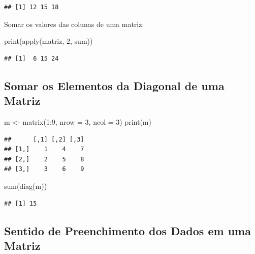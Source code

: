 \documentclass[
]{article}
\newenvironment{Shaded}{\begin{snugshade}}{\end{snugshade}}
\newcommand{\AttributeTok}[1]{\textcolor[rgb]{0.77,0.63,0.00}{#1}}
\newcommand{\DecValTok}[1]{\textcolor[rgb]{0.00,0.00,0.81}{#1}}
\newcommand{\FunctionTok}[1]{\textcolor[rgb]{0.00,0.00,0.00}{#1}}
\newcommand{\NormalTok}[1]{#1}
\newcommand{\OtherTok}[1]{\textcolor[rgb]{0.56,0.35,0.01}{#1}}
\newcommand{\SpecialCharTok}[1]{\textcolor[rgb]{0.00,0.00,0.00}{#1}}
\begin{document}
\begin{verbatim}
## [1] 12 15 18
\end{verbatim}

Somar os valores das colunas de uma matriz:

\begin{Shaded}
\begin{Highlighting}[]
\FunctionTok{print}\NormalTok{(}\FunctionTok{apply}\NormalTok{(matriz, }\DecValTok{2}\NormalTok{, sum))}
\end{Highlighting}
\end{Shaded}

\begin{verbatim}
## [1]  6 15 24
\end{verbatim}

\hypertarget{somar-os-elementos-da-diagonal-de-uma-matriz}{%
\subsection{Somar os Elementos da Diagonal de uma
Matriz}\label{somar-os-elementos-da-diagonal-de-uma-matriz}}

\begin{Shaded}
\begin{Highlighting}[]
\NormalTok{m }\OtherTok{\textless{}{-}} \FunctionTok{matrix}\NormalTok{(}\DecValTok{1}\SpecialCharTok{:}\DecValTok{9}\NormalTok{, }\AttributeTok{nrow =} \DecValTok{3}\NormalTok{, }\AttributeTok{ncol =} \DecValTok{3}\NormalTok{)}
\FunctionTok{print}\NormalTok{(m)}
\end{Highlighting}
\end{Shaded}

\begin{verbatim}
##      [,1] [,2] [,3]
## [1,]    1    4    7
## [2,]    2    5    8
## [3,]    3    6    9
\end{verbatim}

\begin{Shaded}
\begin{Highlighting}[]
\FunctionTok{sum}\NormalTok{(}\FunctionTok{diag}\NormalTok{(m))}
\end{Highlighting}
\end{Shaded}

\begin{verbatim}
## [1] 15
\end{verbatim}

\hypertarget{sentido-de-preenchimento-dos-dados-em-uma-matriz}{%
\subsection{Sentido de Preenchimento dos Dados em uma
Matriz}\label{sentido-de-preenchimento-dos-dados-em-uma-matriz}}
\end{document}
